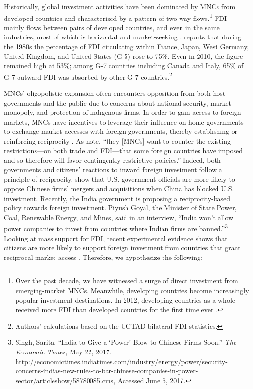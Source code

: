 \documentclass[reqno,onecolumn,letterpaper,12pt]{article}
\begin{document}
Historically, global investment activities have been dominated by MNCs from developed countries and characterized by a pattern of two-way flows.\footnote{Over the past decade, we have witnessed a surge of direct investment from emerging-market MNCs. Meanwhile, developing countries become increasingly popular investment destinations. In 2012, developing countries as a whole received more FDI than developed countries for the first time ever \citep{UNCTAD:2013}.} FDI mainly flows between pairs of developed countries, and even in the same industries, most of which is horizontal and market-seeking \citep[171]{Markusen:1995}. \citet[~22]{Julius:1990} reports that during the 1980s the percentage of FDI circulating within France, Japan, West Germany, United Kingdom, and United States (G-5) rose to 75\%. Even in 2010, the figure remained high at 53\%; among G-7 countries including Canada and Italy, 65\% of G-7 outward FDI was absorbed by other G-7 countries.\footnote{Authors' calculations based on the UCTAD bilateral FDI statistics.}

MNCs' oligopolistic expansion often encounters opposition from both host governments and the public due to concerns about national security, market monopoly, and protection of indigenous firms. In order to gain access to foreign markets, MNCs have incentives to leverage their influence on home governments to exchange market accesses with foreign governments, thereby establishing or reinforcing reciprocity \citep{Milner:1988,Crystal:2003}. As \citet[6]{Crystal:2003} note, ``they [MNCs] want to counter the existing restrictions---on both trade and FDI---that some foreign countries have imposed and so therefore will favor contingently restrictive policies.'' Indeed, both governments and citizens' reactions to inward foreign investment follow a principle of reciprocity. \citet{Tingley:2015} show that U.S. government officials are more likely to oppose Chinese firms' mergers and acquisitions when China has blocked U.S. investment. Recently, the India government is proposing a reciprocity-based policy towards foreign investment. Piyush Goyal, the Minister of State Power, Coal, Renewable Energy, and Mines, said in an interview, ``India won't allow power companies to invest from countries where Indian firms are banned.''\footnote{Singh, Sarita. ``India to Give a `Power' Blow to Chinese Firms Soon.'' \textit{The Economic Times}, May 22, 2017. \url{http://economictimes.indiatimes.com/industry/energy/power/security-concerns-indias-new-rules-to-bar-chinese-companies-in-power-sector/articleshow/58780085.cms}, Accessed June 6, 2017.} Looking at mass support for FDI, recent experimental evidence shows that citizens are more likely to support foreign investment from countries that grant reciprocal market access \citep{Chilton_et_al:forthcoming}. Therefore, we hypothesize the following:
\end{document}
